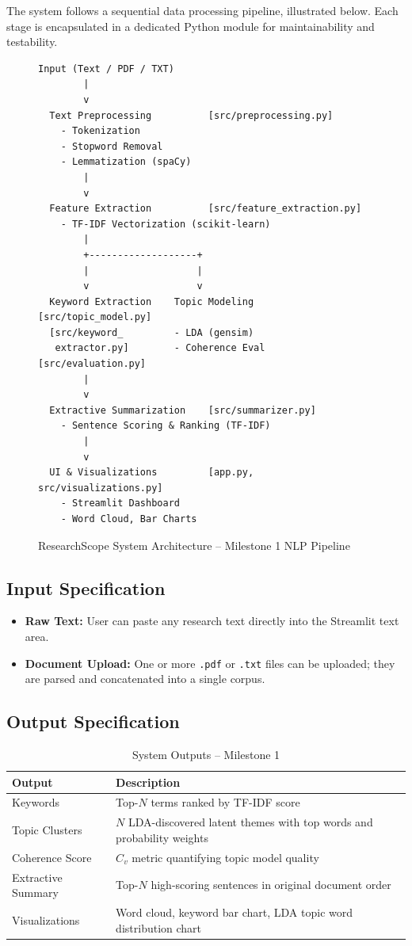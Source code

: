 \documentclass[12pt, a4paper]{article}
\begin{document}
The system follows a sequential data processing pipeline, illustrated below. Each stage is encapsulated in a dedicated Python module for maintainability and testability.

\begin{figure}[H]
\centering
\begin{lstlisting}[language={}]
  Input (Text / PDF / TXT)
        |
        v
  Text Preprocessing          [src/preprocessing.py]
    - Tokenization
    - Stopword Removal
    - Lemmatization (spaCy)
        |
        v
  Feature Extraction          [src/feature_extraction.py]
    - TF-IDF Vectorization (scikit-learn)
        |
        +-------------------+
        |                   |
        v                   v
  Keyword Extraction    Topic Modeling         [src/topic_model.py]
  [src/keyword_         - LDA (gensim)
   extractor.py]        - Coherence Eval       [src/evaluation.py]
        |
        v
  Extractive Summarization    [src/summarizer.py]
    - Sentence Scoring & Ranking (TF-IDF)
        |
        v
  UI & Visualizations         [app.py, src/visualizations.py]
    - Streamlit Dashboard
    - Word Cloud, Bar Charts
\end{lstlisting}
\caption{ResearchScope System Architecture -- Milestone 1 NLP Pipeline}
\end{figure}

\subsection{Input Specification}
\begin{itemize}
  \item \textbf{Raw Text:} User can paste any research text directly into the Streamlit text area.
  \item \textbf{Document Upload:} One or more \texttt{.pdf} or \texttt{.txt} files can be uploaded; they are parsed and concatenated into a single corpus.
\end{itemize}

\subsection{Output Specification}
\begin{table}[H]
\centering
\caption{System Outputs -- Milestone 1}
\begin{tabular}{@{}lp{9cm}@{}}
\toprule
\textbf{Output} & \textbf{Description} \\
\midrule
Keywords         & Top-$N$ terms ranked by TF-IDF score \\
Topic Clusters   & $N$ LDA-discovered latent themes with top words and probability weights \\
Coherence Score  & $C_v$ metric quantifying topic model quality \\
Extractive Summary & Top-$N$ high-scoring sentences in original document order \\
Visualizations   & Word cloud, keyword bar chart, LDA topic word distribution chart \\
\bottomrule
\end{tabular}
\end{table}
\end{document}

